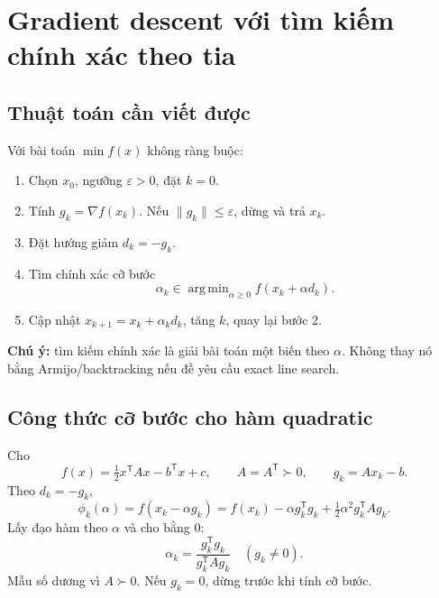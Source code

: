 \documentclass[11pt,a4paper]{article}
\newcommand{\grad}{\nabla}
\newcommand{\T}{^{\mathsf T}}
\DeclareMathOperator*{\argmin}{arg\,min}
\begin{document}
\section{Gradient descent với tìm kiếm chính xác theo tia}
\subsection{Thuật toán cần viết được}
Với bài toán \(\min f(x)\) không ràng buộc:
\begin{enumerate}
\item Chọn \(x_0\), ngưỡng \(\varepsilon>0\), đặt \(k=0\).
\item Tính \(g_k=\grad f(x_k)\). Nếu \(\|g_k\|\le\varepsilon\), dừng và trả \(x_k\).
\item Đặt hướng giảm \(d_k=-g_k\).
\item Tìm chính xác cỡ bước
\[
\alpha_k\in\argmin_{\alpha\ge0} f(x_k+\alpha d_k).
\]
\item Cập nhật \(x_{k+1}=x_k+\alpha_kd_k\), tăng \(k\), quay lại bước 2.
\end{enumerate}
\textbf{Chú ý:} tìm kiếm chính xác là giải bài toán một biến theo \(\alpha\). Không thay nó bằng Armijo/backtracking nếu đề yêu cầu exact line search.

\subsection{Công thức cỡ bước cho hàm quadratic}
Cho
\[
f(x)=\tfrac12x\T Ax-b\T x+c,\qquad A=A\T\succ0,\qquad g_k=Ax_k-b.
\]
Theo \(d_k=-g_k\),
\[
\phi_k(\alpha)=f(x_k-\alpha g_k)
=f(x_k)-\alpha g_k\T g_k+\tfrac12\alpha^2g_k\T Ag_k.
\]
Lấy đạo hàm theo \(\alpha\) và cho bằng \(0\):
\[
\boxed{\alpha_k=\frac{g_k\T g_k}{g_k\T Ag_k}}\quad(g_k\ne0).
\]
Mẫu số dương vì \(A\succ0\). Nếu \(g_k=0\), dừng trước khi tính cỡ bước.

\end{document}
